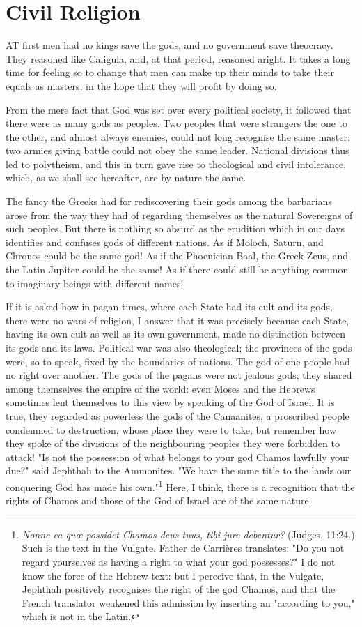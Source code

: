 \documentclass[12pt]{report}
\begin{document}
\section{Civil Religion}
AT first men had no kings save the gods, and no government save theocracy. They reasoned like Caligula, and, at that period, reasoned aright. It takes a long time for feeling so to change that men can make up their minds to take their equals as masters, in the hope that they will profit by doing so.

From the mere fact that God was set over every political society, it followed that there were as many gods as peoples. Two peoples that were strangers the one to the other, and almost always enemies, could not long recognise the same master: two armies giving battle could not obey the same leader. National divisions thus led to polytheism, and this in turn gave rise to theological and civil intolerance, which, as we shall see hereafter, are by nature the same.

The fancy the Greeks had for rediscovering their gods among the barbarians arose from the way they had of regarding themselves as the natural Sovereigns of such peoples. But there is nothing so absurd as the erudition which in our days identifies and confuses gods of different nations. As if Moloch, Saturn, and Chronos could be the same god! As if the Phoenician Baal, the Greek Zeus, and the Latin Jupiter could be the same! As if there could still be anything common to imaginary beings with different names!

If it is asked how in pagan times, where each State had its cult and its gods, there were no wars of religion, I answer that it was precisely because each State, having its own cult as well as its own government, made no distinction between its gods and its laws. Political war was also theological; the provinces of the gods were, so to speak, fixed by the boundaries of nations. The god of one people had no right over another. The gods of the pagans were not jealous gods; they shared among themselves the empire of the world: even Moses and the Hebrews sometimes lent themselves to this view by speaking of the God of Israel. It is true, they regarded as powerless the gods of the Canaanites, a proscribed people condemned to destruction, whose place they were to take; but remember how they spoke of the divisions of the neighbouring peoples they were forbidden to attack! "Is not the possession of what belongs to your god Chamos lawfully your due?" said Jephthah to the Ammonites. "We have the same title to the lands our conquering God has made his own."\footnote{\textit{Nonne ea quœ possidet Chamos deus tuus, tibi jure debentur?} (Judges, 11:24.) Such is the text in the Vulgate. Father de Carrières translates: "Do you not regard yourselves as having a right to what your god possesses?" I do not know the force of the Hebrew text: but I perceive that, in the Vulgate, Jephthah positively recognises the right of the god Chamos, and that the French translator weakened this admission by inserting an "according to you," which is not in the Latin.} Here, I think, there is a recognition that the rights of Chamos and those of the God of Israel are of the same nature.
\end{document}
